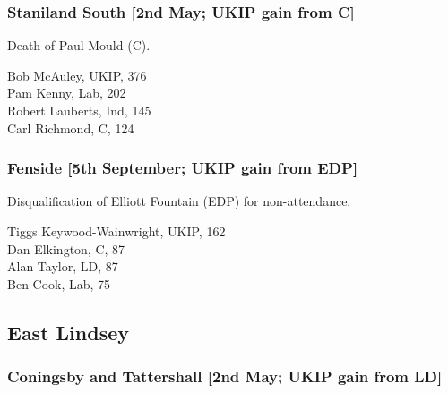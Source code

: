 \documentclass[a4paper,openany,10pt]{book}
\begin{document}
\subsubsection*{Staniland South \hspace*{\fill}\nolinebreak[1]%
\enspace\hspace*{\fill}
[2nd May; UKIP gain from C]}


Death of Paul Mould (C).



Bob McAuley, UKIP, 376\\
Pam Kenny, Lab, 202\\
Robert Lauberts, Ind, 145\\
Carl Richmond, C, 124\\


\subsubsection*{Fenside \hspace*{\fill}\nolinebreak[1]%
\enspace\hspace*{\fill}
[5th September; UKIP gain from EDP]}


Disqualification of Elliott Fountain (EDP) for non-attendance.



{Tiggs Keywood-Wainwright}, UKIP, 162\\
Dan Elkington, C, 87\\
Alan Taylor, LD, 87\\
Ben Cook, Lab, 75\\


\subsection*{East Lindsey}

\subsubsection*{Coningsby and Tattershall \hspace*{\fill}\nolinebreak[1]%
\enspace\hspace*{\fill}
[2nd May; UKIP gain from LD]}

\end{document}
